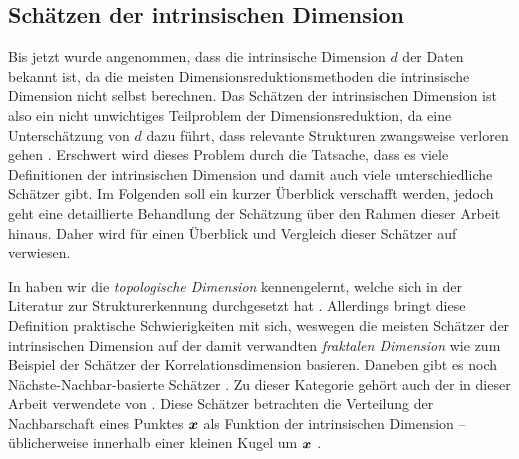 \subsection{Schätzen der intrinsischen Dimension}
\label{ch:Vergleich:sec:Methodik:subsec:SchaetzenDerIntrinsischenDim}

Bis jetzt wurde angenommen, dass die intrinsische Dimension $d$ der Daten bekannt ist, da die
meisten Dimensionsreduktionsmethoden die intrinsische Dimension nicht selbst berechnen. Das
Schätzen der intrinsischen Dimension ist also ein nicht unwichtiges Teilproblem der
Dimensionsreduktion, da eine Unterschätzung von $d$ dazu führt, dass relevante Strukturen
zwangsweise verloren gehen \parencite[1]{Levina.2004}. Erschwert wird dieses Problem durch die Tatsache, dass es viele
Definitionen der intrinsischen Dimension und damit auch viele unterschiedliche Schätzer gibt. Im
Folgenden soll ein kurzer Überblick verschafft werden, jedoch geht eine detaillierte Behandlung der
Schätzung über den Rahmen dieser Arbeit hinaus. Daher wird für einen Überblick und Vergleich dieser
Schätzer auf \textcites{Campadelli.2015}{Bac.2021}{Verveer.1995} verwiesen.

In  haben wir die \textit{topologische
	Dimension} kennengelernt, welche sich in der Literatur zur Strukturerkennung durchgesetzt hat \parencite[1]{Campadelli.2015}. Allerdings bringt diese Definition praktische Schwierigkeiten mit sich,
weswegen die meisten Schätzer der intrinsischen Dimension auf der damit verwandten
\textit{fraktalen Dimension} wie zum Beispiel der Schätzer der Korrelationsdimension \parencite{Camastra.2002} basieren. Daneben gibt es noch Nächste-Nachbar-basierte Schätzer \parencite[1]{Campadelli.2015}. Zu dieser Kategorie gehört auch der in dieser Arbeit verwendete
 von \textcite{Levina.2004}. Diese Schätzer betrachten die
Verteilung der Nachbarschaft eines Punktes $\bm{x}$ als Funktion der intrinsischen Dimension --
üblicherweise innerhalb einer kleinen Kugel um $\bm{x}$
\parencite[8]{Campadelli.2015}.


